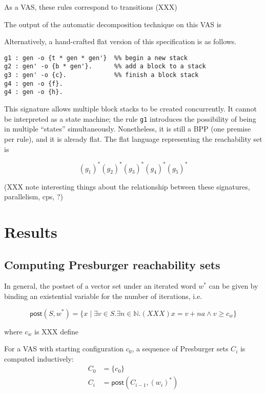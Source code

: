 \documentclass[fullpage, 11pt]{article}
\begin{document}
As a VAS, these rules correspond to transitions (XXX)

The output of the automatic decomposition technique on this VAS is

Alternatively, a hand-crafted flat version of this specification is as
follows.

\begin{verbatim}
g1 : gen -o {t * gen * gen'}  %% begin a new stack
g2 : gen' -o {b * gen'}.      %% add a block to a stack
g3 : gen' -o {c}.             %% finish a block stack
g4 : gen -o {f}.        
g4 : gen -o {h}.       
\end{verbatim}

This signature allows multiple block stacks to be created concurrently. It
cannot be interpreted as a state machine; the rule \verb|g1| introduces the
possibility of being in multiple ``states'' simultaneously. Nonetheless, it
is still a BPP (one premise per rule), and it is already flat. The flat
language representing the reachability set is

\[
(g_1)^*(g_2)^*(g_3)^*(g_4)^*(g_5)^*
\]

(XXX note interesting things about the relationship between these
 signatures, parallelism, cps, ?)

\section{Results}
\label{sec:results}

\subsection{Computing Presburger reachability sets}

In general, the postset of a vector set under an iterated word $w^*$ can be
given by binding an existential variable for the number of iterations, i.e.

\[
\mathsf{post}(S, w^*) =
\{x \mid \exists v\in S.
\exists n\in\mathbb{N}. (XXX) x = v + na \land v \geq c_w
\}
\]

where $c_w$ is XXX define

For a VAS with starting configuration $c_0$, a sequence of Presburger sets
$C_i$ is computed inductively:
\begin{eqnarray*}
C_0 &= \{c_0\} \\
C_i &= \mathsf{post}(C_{i-1}, (w_i)^*)
\end{eqnarray*}
\end{document}
